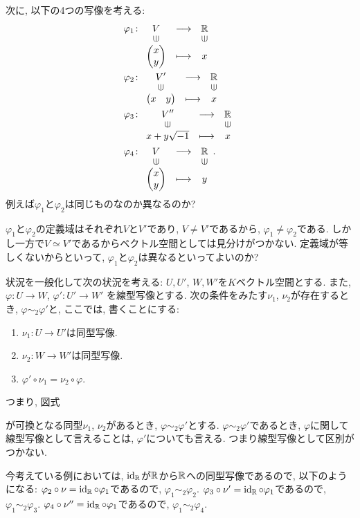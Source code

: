 次に, 以下の4つの写像を考える:
\begin{align*}
  \varphi_1\colon&
  \Shazo{V}{\RR}{\begin{pmatrix}x\\y\end{pmatrix}}{x}\\
  \varphi_2\colon&
  \Shazo{V'}{\RR}{\begin{pmatrix}x&y\end{pmatrix}}{x}\\
  \varphi_3\colon&
  \Shazo{V''}{\RR}{x+y\sqrt{-1}}{x}\\
  \varphi_4\colon&
  \Shazo{V}{\RR}{\begin{pmatrix}x\\y\end{pmatrix}}{y}.
\end{align*}
例えば$\varphi_1$と$\varphi_2$は同じものなのか異なるのか?

$\varphi_1$と$\varphi_2$の定義域はそれぞれ$V$と$V'$であり,
$V\neq V'$であるから, $\varphi_1\neq \varphi_2$である.
しかし一方で$V\simeq V'$であるからベクトル空間としては見分けがつかない.
定義域が等しくないからといって,
$\varphi_1$と$\varphi_2$は異なるといってよいのか?

状況を一般化して次の状況を考える:
$U,U'$, $W,W'$を$K$ベクトル空間とする.
また, $\varphi\colon U\to W$,
$\varphi'\colon U'\to W'$
を線型写像とする.
次の条件をみたす$\nu_1$, $\nu_2$が存在するとき,
$\varphi\sim_2\varphi'$と, ここでは, 書くことにする:
\begin{enumerate}
  \item $\nu_1\colon U\to U'$は同型写像.
  \item $\nu_2\colon W\to W'$は同型写像.
  \item $\varphi'\circ\nu_1=\nu_2\circ\varphi$.
\end{enumerate}
つまり, 図式
\begin{center}
\end{center}
が可換となる同型$\nu_1$, $\nu_2$があるとき,
$\varphi\sim_2\varphi'$とする.
$\varphi\sim_2\varphi'$であるとき,
$\varphi$に関して線型写像として言えることは,
$\varphi'$についても言える.
つまり線型写像として区別がつかない.

今考えている例においては, $\operatorname{id}_{\mathbb{R}}$が$\mathbb{R}$から$\mathbb{R}$への同型写像であるので, 以下のようになる:
$\varphi_2\circ\nu= \operatorname{id}_{\mathbb{R}}\circ\varphi_1$であるので,
$\varphi_1\sim_2 \varphi_2$.
$\varphi_3\circ\nu'= \operatorname{id}_{\mathbb{R}}\circ\varphi_1$であるので,
$\varphi_1\sim_2 \varphi_3$.
$\varphi_4\circ\nu''= \operatorname{id}_{\mathbb{R}}\circ\varphi_1$であるので,
$\varphi_1\sim_2 \varphi_4$.


